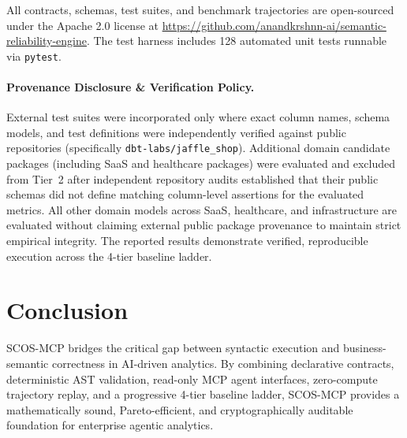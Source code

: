 \documentclass[11pt,a4paper]{article}
\begin{document}
All contracts, schemas, test suites, and benchmark trajectories are open-sourced under the Apache 2.0 license at \url{https://github.com/anandkrshnn-ai/semantic-reliability-engine}. The test harness includes 128 automated unit tests runnable via \texttt{pytest}.


\paragraph{Provenance Disclosure \& Verification Policy.} External test suites were incorporated only where exact column names, schema models, and test definitions were independently verified against public repositories (specifically \texttt{dbt-labs/jaffle\_shop}). Additional domain candidate packages (including SaaS and healthcare packages) were evaluated and excluded from Tier~2 after independent repository audits established that their public schemas did not define matching column-level assertions for the evaluated metrics. All other domain models across SaaS, healthcare, and infrastructure are evaluated without claiming external public package provenance to maintain strict empirical integrity. The reported results demonstrate verified, reproducible execution across the 4-tier baseline ladder.


\section{Conclusion}
\label{sec:conclusion}

SCOS-MCP bridges the critical gap between syntactic execution and business-semantic correctness in AI-driven analytics. By combining declarative contracts, deterministic AST validation, read-only MCP agent interfaces, zero-compute trajectory replay, and a progressive 4-tier baseline ladder, SCOS-MCP provides a mathematically sound, Pareto-efficient, and cryptographically auditable foundation for enterprise agentic analytics.
\end{document}
